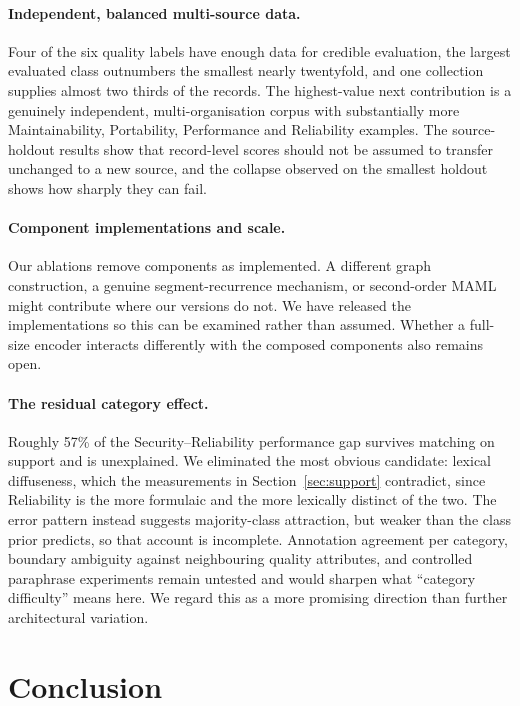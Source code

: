 \documentclass[11pt,a4paper]{article}
\begin{document}
\paragraph{Independent, balanced multi-source data.}
Four of the six quality labels have enough data for credible evaluation, the largest evaluated class
outnumbers the smallest nearly twentyfold, and one collection supplies almost two thirds of the records.
The highest-value next contribution is a genuinely independent, multi-organisation corpus with
substantially more Maintainability, Portability, Performance and Reliability examples. The source-holdout
results show that record-level scores should not be assumed to transfer unchanged to a new source, and the
collapse observed on the smallest holdout shows how sharply they can fail.


\paragraph{Component implementations and scale.}
Our ablations remove components as implemented. A different graph construction, a genuine
segment-recurrence mechanism, or second-order MAML might contribute where our versions do not. We have released the implementations so this can be examined rather than assumed.
Whether a full-size encoder interacts differently with the composed components also remains
open.

\paragraph{The residual category effect.}
Roughly 57\% of the Security--Reliability performance gap survives matching on support and
is unexplained. We eliminated the most obvious candidate: lexical diffuseness, which the
measurements in Section~\ref{sec:support} contradict, since Reliability is the more
formulaic and the more lexically distinct of the two. The error pattern instead suggests
majority-class attraction, but weaker than the class prior predicts, so that account is
incomplete. Annotation agreement per category, boundary ambiguity against neighbouring
quality attributes, and controlled paraphrase experiments remain untested and would
sharpen what ``category difficulty'' means here. We regard this as a more promising
direction than further architectural variation.

\section{Conclusion}
\label{sec:conclusion}
\end{document}
